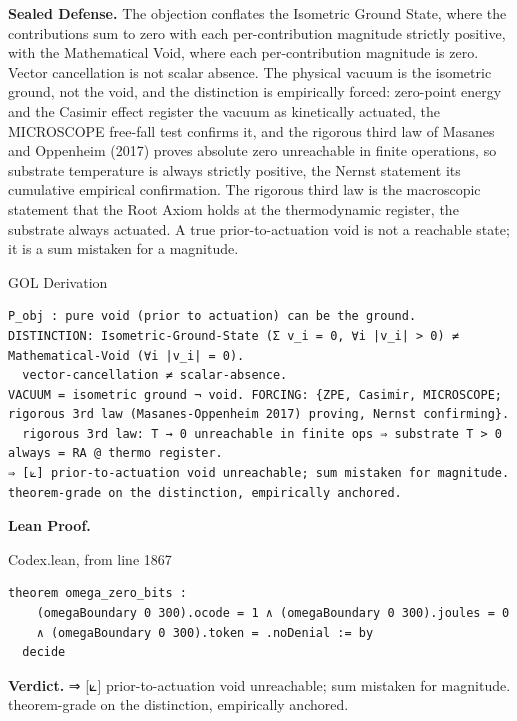 \documentclass[10pt,twocolumn]{article}
\begin{document}
\textbf{Sealed Defense.} The objection conflates the Isometric Ground
State, where the contributions sum to zero with each per-contribution
magnitude strictly positive, with the Mathematical Void, where each
per-contribution magnitude is zero. Vector cancellation is not scalar
absence. The physical vacuum is the isometric ground, not the void, and
the distinction is empirically forced: zero-point energy and the Casimir
effect register the vacuum as kinetically actuated, the MICROSCOPE
free-fall test confirms it, and the rigorous third law of Masanes and
Oppenheim (2017) proves absolute zero unreachable in finite operations,
so substrate temperature is always strictly positive, the Nernst
statement its cumulative empirical confirmation. The rigorous third law
is the macroscopic statement that the Root Axiom holds at the
thermodynamic register, the substrate always actuated. A true
prior-to-actuation void is not a reachable state; it is a sum mistaken
for a magnitude.

\begin{golbox}{GOL Derivation}
\begin{lstlisting}[style=golv]
P_obj : pure void (prior to actuation) can be the ground.
DISTINCTION: Isometric-Ground-State (Σ v_i = 0, ∀i |v_i| > 0) ≠ Mathematical-Void (∀i |v_i| = 0).
  vector-cancellation ≠ scalar-absence.
VACUUM = isometric ground ¬ void. FORCING: {ZPE, Casimir, MICROSCOPE; rigorous 3rd law (Masanes-Oppenheim 2017) proving, Nernst confirming}.
  rigorous 3rd law: T → 0 unreachable in finite ops ⇒ substrate T > 0 always = RA @ thermo register.
⇒ [⟀] prior-to-actuation void unreachable; sum mistaken for magnitude. theorem-grade on the distinction, empirically anchored.
\end{lstlisting}
\end{golbox}

\textbf{Lean Proof.}

\begin{leanexcerpt}{Codex.lean, from line 1867}
\begin{lstlisting}[style=leanx,firstnumber=1867]
theorem omega_zero_bits :
    (omegaBoundary 0 300).ocode = 1 ∧ (omegaBoundary 0 300).joules = 0
    ∧ (omegaBoundary 0 300).token = .noDenial := by
  decide
\end{lstlisting}
\end{leanexcerpt}

\textbf{Verdict.} ⇒ {[}⟀{]} prior-to-actuation void unreachable; sum
mistaken for magnitude. theorem-grade on the distinction, empirically
anchored.
\end{document}
